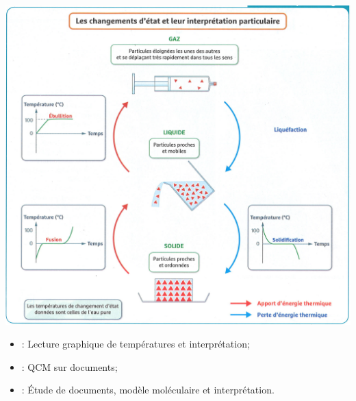 \documentclass[12pt,a4paper]{article}
\begin{document}
\begin{center}
	\includegraphics[scale=0.7]{chgmt_etats}
\end{center}

\begin{myexos}
	\begin{itemize}
		\item {} : Lecture graphique de températures et interprétation;
		\item {} : QCM sur documents;
		\item {} : \'Etude de documents, modèle moléculaire et interprétation.
	\end{itemize}
\end{myexos}
\appendix

\end{document}
